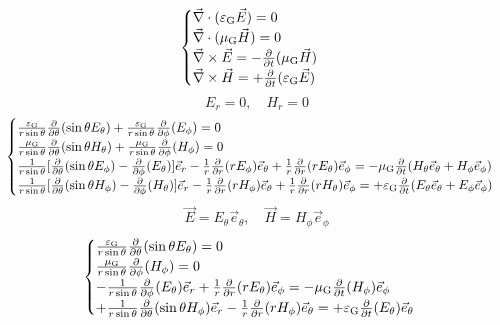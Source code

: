 \begin{equation}
    \begin{cases}
        \vec{\nabla}\cdot(\varepsilon_{\text{G}}\vec{E})=0\\
        \vec{\nabla}\cdot(\mu_{\text{G}}\vec{H})=0\\
        \vec{\nabla}\times\vec{E}=-\frac{\partial}{\partial t}(\mu_{\text{G}}\vec{H})\\
        \vec{\nabla}\times\vec{H}=+\frac{\partial}{\partial t}(\varepsilon_{\text{G}}\vec{E})
    \end{cases}
\end{equation}
\begin{equation}
    {E}_r=0,\quad{H}_r=0
\end{equation}
\begin{equation}
    \begin{cases}
        \frac{\varepsilon_{\text{G}}}{r\sin\theta}\frac{\partial}{\partial\theta}(\sin\theta{E}_\theta)+\frac{\varepsilon_{\text{G}}}{r\sin\theta}\frac{\partial}{\partial\phi}({E}_\phi)=0\\
        \frac{\mu_{\text{G}}}{r\sin\theta}\frac{\partial}{\partial\theta}(\sin\theta{H}_\theta)+\frac{\mu_{\text{G}}}{r\sin\theta}\frac{\partial}{\partial\phi}({H}_\phi)=0\\
        \frac{1}{r\sin\theta}[\frac{\partial}{\partial\theta}(\sin\theta{E}_\phi)-\frac{\partial}{\partial\phi}({E}_\theta)]\vec{e}_r-\frac{1}{r}\frac{\partial}{\partial r}(r{E}_\phi)\vec{e}_\theta+\frac{1}{r}\frac{\partial}{\partial r}(r{E}_\theta)\vec{e}_\phi=-\mu_{\text{G}}\frac{\partial}{\partial t}({H}_\theta\vec{e}_\theta+{H}_\phi\vec{e}_\phi)\\
        \frac{1}{r\sin\theta}[\frac{\partial}{\partial\theta}(\sin\theta{H}_\phi)-\frac{\partial}{\partial\phi}({H}_\theta)]\vec{e}_r-\frac{1}{r}\frac{\partial}{\partial r}(r{H}_\phi)\vec{e}_\theta+\frac{1}{r}\frac{\partial}{\partial r}(r{H}_\theta)\vec{e}_\phi=+\varepsilon_{\text{G}}\frac{\partial}{\partial t}({E}_\theta\vec{e}_\theta+{E}_\phi\vec{e}_\phi)
    \end{cases}
\end{equation}
\begin{equation}
    \vec{E}={E}_\theta\vec{e}_\theta,\quad\vec{H}={H}_\phi\vec{e}_\phi
\end{equation}
\begin{equation}
    \begin{cases}
        \frac{\varepsilon_{\text{G}}}{r\sin\theta}\frac{\partial}{\partial\theta}(\sin\theta E_\theta)=0\\
        \frac{\mu_{\text{G}}}{r\sin\theta}\frac{\partial}{\partial\phi}({H}_\phi)=0\\
        -\frac{1}{r\sin\theta}\frac{\partial}{\partial\phi}({E}_\theta)\vec{e}_r+\frac{1}{r}\frac{\partial}{\partial r}(r{E}_\theta)\vec{e}_\phi=-\mu_{\text{G}}\frac{\partial}{\partial t}({H}_\phi)\vec{e}_\phi\\
        +\frac{1}{r\sin\theta}\frac{\partial}{\partial\theta}(\sin\theta{H}_\phi)\vec{e}_r-\frac{1}{r}\frac{\partial}{\partial r}(r{H}_\phi)\vec{e}_\theta=+\varepsilon_{\text{G}}\frac{\partial}{\partial t}({E}_\theta)\vec{e}_\theta\\
    \end{cases}
\end{equation}

